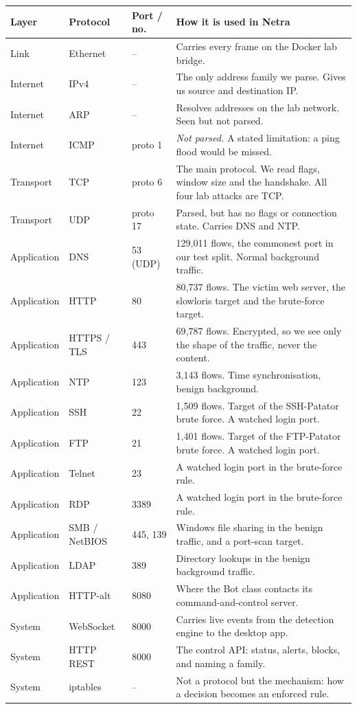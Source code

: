 \documentclass[11pt,a4paper]{article}
\begin{document}
\begin{table}[h]
\centering
\small
\begin{tabular}{@{}p{1.6cm}p{2.2cm}p{1.6cm}p{7.4cm}@{}}
\toprule
\textbf{Layer} & \textbf{Protocol} & \textbf{Port / no.} & \textbf{How it is used in Netra} \\
\midrule
Link & Ethernet & -- & Carries every frame on the Docker lab bridge. \\
Internet & IPv4 & -- & The only address family we parse. Gives us source and destination IP. \\
Internet & ARP & -- & Resolves addresses on the lab network. Seen but not parsed. \\
Internet & ICMP & proto 1 & \textit{Not parsed.} A stated limitation: a ping flood would be missed. \\
Transport & TCP & proto 6 & The main protocol. We read flags, window size and the handshake. All four lab attacks are TCP. \\
Transport & UDP & proto 17 & Parsed, but has no flags or connection state. Carries DNS and NTP. \\
\midrule
Application & DNS & 53 (UDP) & 129,011 flows, the commonest port in our test split. Normal background traffic. \\
Application & HTTP & 80 & 80,737 flows. The victim web server, the slowloris target and the brute-force target. \\
Application & HTTPS / TLS & 443 & 69,787 flows. Encrypted, so we see only the shape of the traffic, never the content. \\
Application & NTP & 123 & 3,143 flows. Time synchronisation, benign background. \\
Application & SSH & 22 & 1,509 flows. Target of the SSH-Patator brute force. A watched login port. \\
Application & FTP & 21 & 1,401 flows. Target of the FTP-Patator brute force. A watched login port. \\
Application & Telnet & 23 & A watched login port in the brute-force rule. \\
Application & RDP & 3389 & A watched login port in the brute-force rule. \\
Application & SMB / NetBIOS & 445, 139 & Windows file sharing in the benign traffic, and a port-scan target. \\
Application & LDAP & 389 & Directory lookups in the benign background traffic. \\
Application & HTTP-alt & 8080 & Where the Bot class contacts its command-and-control server. \\
\midrule
System & WebSocket & 8000 & Carries live events from the detection engine to the desktop app. \\
System & HTTP REST & 8000 & The control API: status, alerts, blocks, and naming a family. \\
System & iptables & -- & Not a protocol but the mechanism: how a decision becomes an enforced rule. \\
\bottomrule
\end{tabular}
\end{table}
\end{document}
